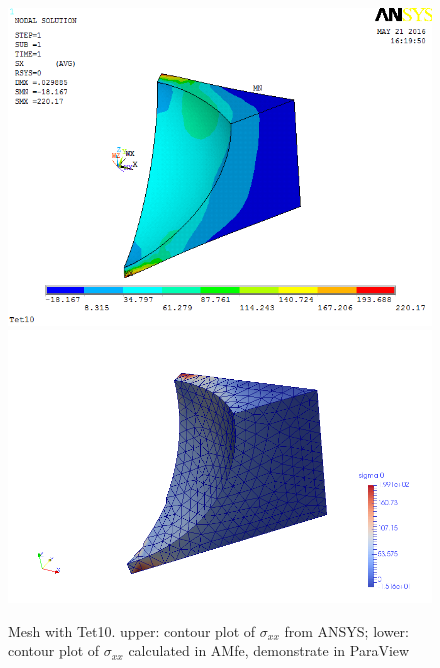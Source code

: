\begin{figure}[htbp]
	\begin{center}
		\includegraphics[width=13cm,clip]{Tet10_Sxx.png} 		
		\includegraphics[width=13cm,clip]{Tet10_Sxx_P.png} 		
		\caption{Mesh with Tet10. upper: contour plot of $\sigma_{xx}$ from ANSYS; lower: contour plot of $\sigma_{xx}$ calculated in AMfe, demonstrate in ParaView} \label{fig: Tet10_Sxx}
	\end{center}
\end{figure}
\clearpage 

